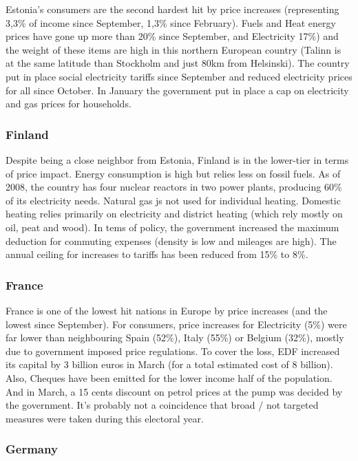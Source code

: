 \documentclass[
  9pt,
  a4paper,
  DIV=11,
  numbers=noendperiod,
  oneside]{scrartcl}
\begin{document}
Estonia's consumers are the second hardest hit by price increases
(representing 3,3\% of income since September, 1,3\% since February).
Fuels and Heat energy prices have gone up more than 20\% since
September, and Electricity 17\%) and the weight of these items are high
in this northern European country (Talinn is at the same latitude than
Stockholm and just 80km from Helsinski). The country put in place social
electricity tariffs since September and reduced electricity prices for
all since October. In January the government put in place a cap on
electricity and gas prices for households.

\hypertarget{finland}{%
\subsubsection{Finland}\label{finland}}

Despite being a close neighbor from Estonia, Finland is in the
lower-tier in terms of price impact. Energy consumption is high but
relies less on fossil fuels. As of 2008, the country has four nuclear
reactors in two power plants, producing 60\% of its electricity needs.
Natural gas js not used for individual heating. Domestic heating relies
primarily on electricity and district heating (which rely mostly on oil,
peat and wood). In tems of policy, the government increased the maximum
deduction for commuting expenses (density is low and mileages are high).
The annual ceiling for increases to tariffs has been reduced from 15\%
to 8\%.

\hypertarget{france}{%
\subsubsection{France}\label{france}}

France is one of the lowest hit nations in Europe by price increases
(and the lowest since September). For consumers, price increases for
Electricity (5\%) were far lower than neighbouring Spain (52\%), Italy
(55\%) or Belgium (32\%), mostly due to government imposed price
regulations. To cover the loss, EDF increased its capital by 3 billion
euros in March (for a total estimated cost of 8 billion). Also, Cheques
have been emitted for the lower income half of the population. And in
March, a 15 cents discount on petrol prices at the pump was decided by
the government. It's probably not a coincidence that broad / not
targeted measures were taken during this electoral year.

\hypertarget{germany}{%
\subsubsection{Germany}\label{germany}}
\end{document}
